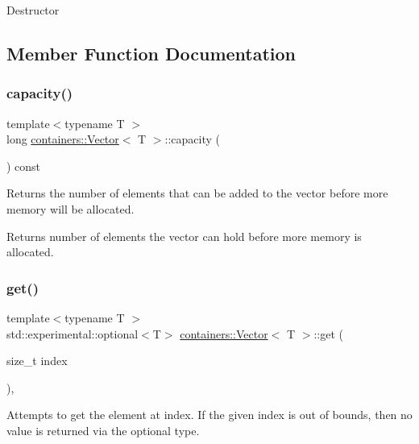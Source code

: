 Destructor 

\subsection{Member Function Documentation}
\mbox{\label{classcontainers_1_1_vector_a11bd73e5c16f891d6828328feacea6b5}} 
\subsubsection{\texorpdfstring{capacity()}{capacity()}}
{\footnotesize\ttfamily template$<$typename T $>$ \\
long \hyperlink{classcontainers_1_1_vector}{containers\+::\+Vector}$<$ T $>$\+::capacity (\begin{DoxyParamCaption}{ }\end{DoxyParamCaption}) const\hspace{0.3cm}{\ttfamily [inline]}}

Returns the number of elements that can be added to the vector before more memory will be allocated.

\begin{DoxyReturn}{Returns}
number of elements the vector can hold before more memory is allocated. 
\end{DoxyReturn}
\mbox{\label{classcontainers_1_1_vector_ae744150cc6b0cd929d45e0e138fd5d29}} 
\subsubsection{\texorpdfstring{get()}{get()}}
{\footnotesize\ttfamily template$<$typename T $>$ \\
std\+::experimental\+::optional$<$T$>$ \hyperlink{classcontainers_1_1_vector}{containers\+::\+Vector}$<$ T $>$\+::get (\begin{DoxyParamCaption}\item[{size\+\_\+t}]{index }\end{DoxyParamCaption})\hspace{0.3cm}{\ttfamily [inline]}, {\ttfamily [noexcept]}}

Attempts to get the element at {\ttfamily index}. If the given index is out of bounds, then no value is returned via the optional type.


